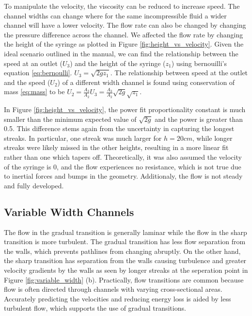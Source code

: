 \documentclass[12pt]{article}
\begin{document}
To manipulate the velocity, the viscosity can be reduced to increase speed. The channel widths can change where for the same incompressible fluid a wider channel will have a lower velocity. The flow rate can also be changed by changing the pressure difference across the channel. We affected the flow rate by changing the height of the syringe as plotted in Figure \ref{fig:height_vs_velocity}. 
Given the ideal scenario outlined in the manual, we can find the relationship between the speed at an outlet ($U_3$) and the height of the syringe ($z_1$) using bernouilli's equation \ref{eq:bernoulli}. 
$U_3 = \sqrt{2gz_1}$. The relationship between speed at the outlet and the speed ($U_2$) of a different width channel is found using conservation of mass \ref{eq:mass} to be $U_2 = \frac{A_3}{A_2}U_3 = \frac{A_3}{A_2} \sqrt{2g} \sqrt{z_1}$.

In Figure \ref{fig:height_vs_velocity}, the power fit proportionality constant is much smaller than the minimum expected value of $\sqrt{2g}$ and the power is greater than 0.5. 
This difference stems again from the uncertainty in capturing the longest streaks. In particular, one streak was much larger for $h = 20cm$, while longer streaks were likely missed in the other heights, resulting in a more linear fit rather than one which tapers off. 
Theoretically, it was also assumed the velocity of the syringe is 0, and the flow experiences no resistance, which is not true due to inertial forces and bumps in the geometry. Additionaly, the flow is not steady and fully developed. 

\subsection*{Variable Width Channels}
The flow in the gradual transition is generally laminar while the flow in the sharp transition is more turbulent. The gradual transition has less flow separation from the walls, which prevents pathlines from changing abruptly. On the other hand, the sharp transition has separation from the walls causing turbulence and greater velocity gradients by the walls as seen by longer streaks at the seperation point in Figure \ref{fig:variable_width} (b).
Practically, flow transitions are common because flow is often directed through channels with varying cross-sectional areas. Accurately predicting the velocities and reducing energy loss is aided by less turbulent flow, which supports the use of gradual transitions. 
\end{document}
